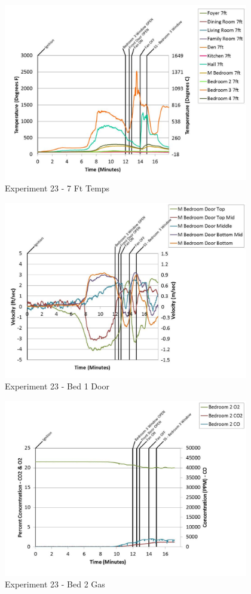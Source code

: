 \documentclass{article}
\begin{document}
\begin{appendices}
	\begin{figure}[h!]
		\centering
		\includegraphics[height=3.05in]{0_Images/Results_Charts/Exp_23_Charts/7FtTemps.pdf}
		\caption{Experiment 23 - 7 Ft Temps}
	\end{figure}
 
	\clearpage

	\begin{figure}[h!]
		\centering
		\includegraphics[height=3.05in]{0_Images/Results_Charts/Exp_23_Charts/Bed1Door.pdf}
		\caption{Experiment 23 - Bed 1 Door}
	\end{figure}
 

	\begin{figure}[h!]
		\centering
		\includegraphics[height=3.05in]{0_Images/Results_Charts/Exp_23_Charts/Bed2Gas.pdf}
		\caption{Experiment 23 - Bed 2 Gas}
	\end{figure}
 

\end{appendices}
\end{document}

